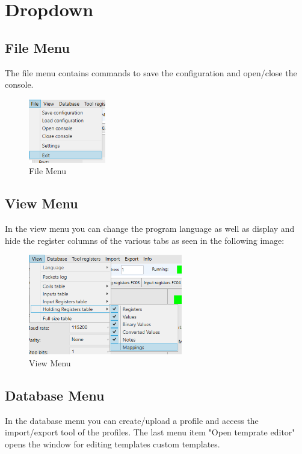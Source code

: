 
\chapter{Dropdown}

\section{File Menu}

The file menu contains commands to save the configuration and open/close the console.

\begin{figure}[H]
\centering
\includegraphics[width=0.3\textwidth]{../Img/Menu_File.PNG}
\caption{File Menu}
\end{figure}

\section{View Menu}

In the view menu you can change the program language as well as display and
hide the register columns of the various tabs as seen in the following image:

\begin{figure}[H]
\centering
\includegraphics[width=0.6\textwidth]{../Img/Menu_View.PNG}
\caption{View Menu}
\end{figure}

\section{Database Menu}

In the database menu you can create/upload a profile and access the import/export tool of the
profiles. The last menu item "Open temprate editor" opens the window for editing templates
custom templates.

